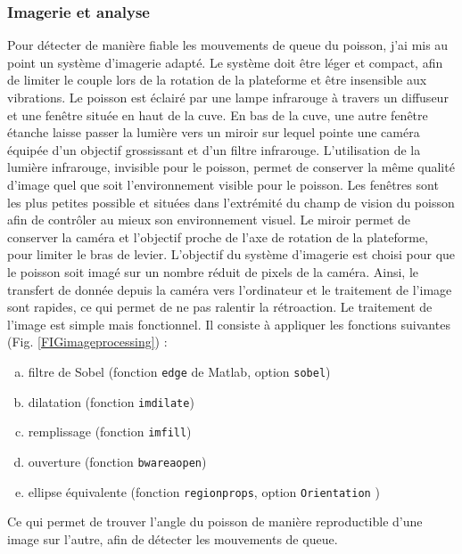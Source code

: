 \subsubsection{Imagerie et analyse}
Pour détecter de manière fiable les mouvements de queue du poisson, j'ai mis au point un système d'imagerie adapté. Le système doit être léger et compact, afin de limiter le couple lors de la rotation de la plateforme et être insensible aux vibrations. Le poisson est éclairé par une lampe infrarouge à travers un diffuseur et une fenêtre située en haut de la cuve. En bas de la cuve, une autre fenêtre étanche laisse passer la lumière vers un miroir sur lequel pointe une caméra équipée d'un objectif grossissant et d'un filtre infrarouge. L'utilisation de la lumière infrarouge, invisible pour le poisson, permet de conserver la même qualité d'image quel que soit l'environnement visible pour le poisson. Les fenêtres sont les plus petites possible et situées dans l'extrémité du champ de vision du poisson afin de contrôler au mieux son environnement visuel. Le miroir permet de conserver la caméra et l'objectif proche de l'axe de rotation de la plateforme, pour limiter le bras de levier.
L'objectif du système d'imagerie est choisi pour que le poisson soit imagé sur un nombre réduit de pixels de la caméra. Ainsi, le transfert de donnée depuis la caméra vers l'ordinateur et le traitement de l'image sont rapides, ce qui permet de ne pas ralentir la rétroaction. Le traitement de l'image est simple mais fonctionnel. Il consiste à appliquer les fonctions suivantes (Fig. \ref{FIGimageprocessing}) :

\begin{enumerate}[a)] \itemsep0em \setcounter{enumi}{1}
    \item filtre de Sobel (fonction \verb|edge| de Matlab, option \verb|sobel|)
    \item dilatation (fonction \verb|imdilate|)
    \item remplissage (fonction \verb|imfill|)
    \item ouverture (fonction \verb|bwareaopen|)
    \item ellipse équivalente (fonction \verb|regionprops|, option \verb|Orientation| )
\end{enumerate}

Ce qui permet de trouver l'angle du poisson de manière reproductible d'une image sur l'autre, afin de détecter les mouvements de queue.

